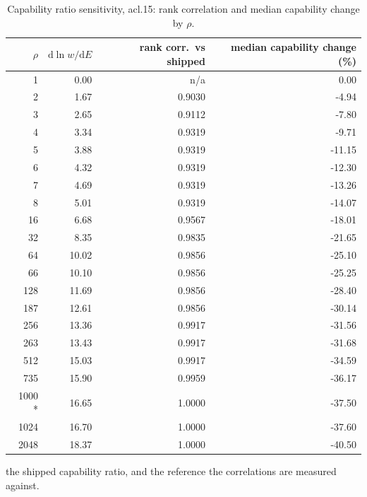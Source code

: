\begin{table}[htbp]
  \centering
  \caption{Capability ratio sensitivity, acl.15: rank correlation and median capability change by $\rho$.}
  \label{tab:rho-acl-15-summary}
  \begin{tabular}{r r r r}
    \toprule
    $\rho$ & $\mathrm{d}\ln w/\mathrm{d}E$ & rank corr.\ vs shipped & median capability change (\%) \\
    \midrule
    1 & 0.00 & n/a & 0.00 \\
    2 & 1.67 & 0.9030 & -4.94 \\
    3 & 2.65 & 0.9112 & -7.80 \\
    4 & 3.34 & 0.9319 & -9.71 \\
    5 & 3.88 & 0.9319 & -11.15 \\
    6 & 4.32 & 0.9319 & -12.30 \\
    7 & 4.69 & 0.9319 & -13.26 \\
    8 & 5.01 & 0.9319 & -14.07 \\
    16 & 6.68 & 0.9567 & -18.01 \\
    32 & 8.35 & 0.9835 & -21.65 \\
    64 & 10.02 & 0.9856 & -25.10 \\
    66 & 10.10 & 0.9856 & -25.25 \\
    128 & 11.69 & 0.9856 & -28.40 \\
    187 & 12.61 & 0.9856 & -30.14 \\
    256 & 13.36 & 0.9917 & -31.56 \\
    263 & 13.43 & 0.9917 & -31.68 \\
    512 & 15.03 & 0.9917 & -34.59 \\
    735 & 15.90 & 0.9959 & -36.17 \\
    1000 * & 16.65 & 1.0000 & -37.50 \\
    1024 & 16.70 & 1.0000 & -37.60 \\
    2048 & 18.37 & 1.0000 & -40.50 \\
    \bottomrule
  \end{tabular}
  \par\smallskip\footnotesize * the shipped capability ratio, and the reference the correlations are measured against.
\end{table}
